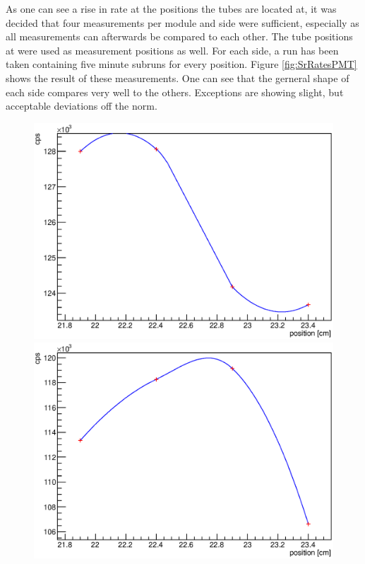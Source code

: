   As one can see a rise in rate at the positions the tubes are located at, it was decided that four measurements per module and side were sufficient, especially as all measurements can afterwards be compared to each other.
  The tube positions at  were used as measurement positions as well. For each side, a run has been taken containing five minute subruns for every position. Figure \ref{fig:SrRatesPMT} shows the result of these measurements. One can see that the gerneral shape of each side compares very well to the others. Exceptions are showing slight, but acceptable deviations off the norm.
  \begin{figure}
	\centering
 	\begin{minipage}[d]{0.24 \textwidth}
		  \includegraphics[width=\textwidth]{graphics/cobalt/modules/1A.eps}
	\end{minipage}
	\begin{minipage}[d]{0.24 \textwidth}
		  \includegraphics[width=\textwidth]{graphics/cobalt/modules/1B.eps}

\end{minipage}
\end{figure}
